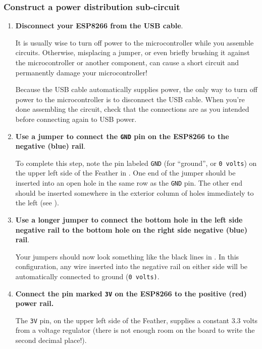 \subsubsection{\howto Construct a power distribution sub-circuit}
\begin{enumerate}
	\item \textbf{Disconnect your ESP8266 from the USB cable}.
	
	It is usually wise to turn off power to the microcontroller while you assemble circuits. 
	Otherwise, misplacing a jumper, or even briefly brushing it against the microcontroller or another component, can cause a short circuit and permanently damage your microcontroller! 
 	
 	Because the USB cable automatically supplies power, the only way to turn off power to the microcontroller is to disconnect the USB cable.
	When you're done assembling the circuit, check that the connections are as you intended before connecting again to USB power.  
	
	\item \textbf{Use a jumper to connect the \texttt{GND} pin on the ESP8266 to the negative (blue) rail}.
	
	To complete this step, note the pin labeled \texttt{GND} (for ``ground'', or \texttt{0 volts}) on the upper left side of the Feather in . 
	One end of the jumper should be inserted into an open hole in the same row as the \texttt{GND} pin. 
	The other end should be inserted somewhere in the exterior column of holes immediately to the left (see ).
	
	\item \textbf{Use a longer jumper to connect the bottom hole in the left side negative rail to the bottom hole on the right side negative (blue) rail}. 
	
	Your jumpers should now look something like the black lines in . 
	In this configuration, any wire inserted into the negative rail on either side will be automatically connected to ground (\texttt{0 volts)}.
	
	\item \textbf{Connect the pin marked \texttt{3V} on the ESP8266 to the positive (red) power rail.}
	
	The \texttt{3V} pin, on the upper left side of the Feather, supplies a constant 3.3 volts from a voltage regulator (there is not enough room on the board to write the second decimal place!).	
	

\end{enumerate}
